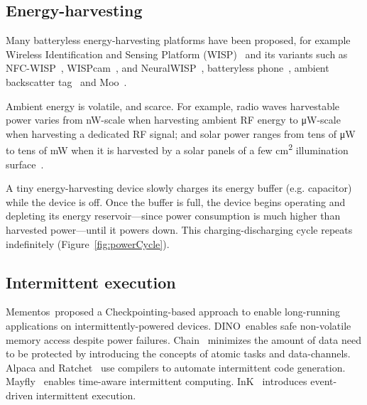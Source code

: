 \subsection{Energy-harvesting}
Many batteryless energy-harvesting platforms have been proposed, for example Wireless Identification and Sensing Platform (WISP)~\cite{smith_ubicomp_2006} and its variants such as NFC-WISP~\cite{zhao2015nfc}, WISPcam~\cite{naderiparizi_rfid_2015}, and NeuralWISP~\cite{yeager2009neuralwisp}, batteryless phone~\cite{talla2017battery}, ambient backscatter tag~\cite{liu2013ambient} and Moo~\cite{moo}.

Ambient energy is volatile, and scarce. For example, radio waves harvestable power varies from \si{\nano\watt}-scale when harvesting ambient RF energy to \si{\uW}-scale when harvesting a dedicated RF signal; and solar power ranges from tens of \si{\uW} to tens of \si{\mW} when it is harvested by a solar panels of a few \si{\cm^2} illumination surface~\cite{lucia2017intermittent,rao2017ambient}.%

A tiny energy-harvesting device slowly charges its energy buffer (e.g. capacitor) while the device is off. Once the buffer is full, the device begins operating and depleting its energy reservoir---since power consumption is much higher than harvested power---until it powers down. This charging-discharging cycle repeats indefinitely (Figure~\ref{fig:powerCycle}). 

\subsection{Intermittent execution}
Mementos~\cite{mementos}proposed a
Checkpointing-based approach to enable long-running applications on intermittently-powered devices. DINO~\cite{dino}enables safe non-volatile memory access despite power failures. Chain~\cite{colin2016chain} minimizes the amount of data need to be protected by introducing the concepts of atomic tasks and data-channels. Alpaca and Ratchet~\cite{maeng2017alpaca,woude2016ratchet} use compilers to automate intermittent code generation. Mayfly~\cite{hester2017timerly} enables time-aware intermittent computing. InK~\cite{yildirim2018ink} introduces event-driven intermittent execution.

